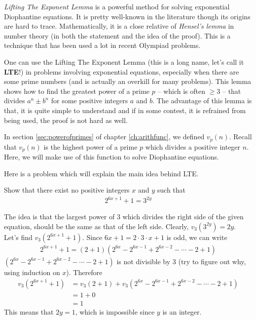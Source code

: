 \textit{Lifting The Exponent Lemma} is a powerful method for solving exponential Diophantine equations. It is pretty well-known in the literature though its origins are hard to trace. Mathematically, it is a close relative of \textit{Hensel's lemma} in number theory (in both the statement and the idea of the proof). This is a technique that has been used a lot in recent Olympiad problems.

One can use the Lifting The Exponent Lemma (this is a long name, let's call it \textbf{LTE}!) in problems involving exponential equations, especially when there are some prime numbers (and is actually an overkill for many problems). This lemma shows how to find the greatest power of a prime $p$ -- which is often $\geq 3$ -- that divides $a^n \pm b^n$ for some positive integers $a$ and $b$. The advantage of this lemma is that, it is quite simple to understand and if in some contest, it is refrained from being used, the proof is not hard as well.


In section \eqref{sec:powerofprimes} of chapter \eqref{ch:arithfunc}, we defined $v_p(n)$. Recall that $v_p(n)$ is the highest power of a prime $p$ which divides a positive integer $n$. Here, we will make use of this function to solve Diophantine equations.

Here is a problem which will explain the main idea behind LTE.

    \begin{problem}
    	Show that there exist no positive integers $x$ and $y$ such that
    	\begin{align*}
    		2^{6x+1} + 1 = 3^{2y}
    	\end{align*}
    \end{problem}

    \begin{solution}
    	The idea is that the largest power of $3$ which divides the right side of the given equation, should be the same as that of the left side. Clearly, $v_3(3^{2y})=2y$. Let's find $v_3\left(2^{6x+1} + 1\right)$. Since $6x+1= 2 \cdot 3 \cdot x +1$ is odd, we can write
    	\begin{align*}
    		2^{6x+1} + 1 = \left(2+1\right) \left(2^{6x} - 2^{6x-1} + 2^{6x-2} - \cdots - 2 + 1\right)
    	\end{align*}
    	$\left(2^{6x} - 2^{6x-1} + 2^{6x-2} - \cdots - 2 + 1\right)$ is not divisible by $3$ (try to figure out why, using induction on $x$). Therefore
    	\begin{align*}
    		v_3\left(2^{6x+1} + 1\right) &= v_3\left(2+1\right) + v_3\left(2^{6x} - 2^{6x-1} + 2^{6x-2} - \cdots - 2 + 1\right)\\
    		& = 1 + 0\\
    		& = 1
    	\end{align*}
    	This means that $2y=1$, which is impossible since $y$ is an integer.
    \end{solution}

